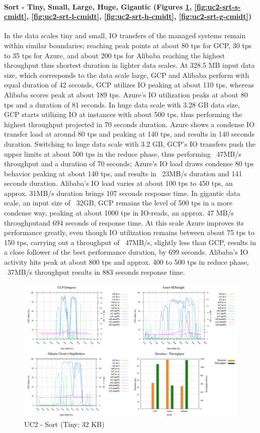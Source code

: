 \documentclass[review]{elsarticle}
\begin{document}
\paragraph{Sort - Tiny, Small, Large, Huge, Gigantic (Figures \ref{fig:uc2-srt-t-cmidt}, \ref{fig:uc2-srt-s-cmidt}, \ref{fig:uc2-srt-l-cmidt}, \ref{fig:uc2-srt-h-cmidt}, \ref{fig:uc2-srt-g-cmidt})} In the data scales tiny and small, IO transfers of the managed systems remain within similar boundaries; reaching peak points at about 80 tps for GCP, 30 tps to 35 tps for Azure, and about 200 tps for Alibaba reaching the highest throughput thus shortest duration in lighter data scales. At 328.5 MB input data size, which corresponds to the data scale large, GCP and Alibaba perform with equal duration of 42 seconds, GCP utilizes IO peaking at about 110 tps, whereas Alibaba scores peak at about 189 tps. Azure's IO utilization peaks at about 80 tps and a duration of 81 seconds. In huge data scale with 3.28 GB data size, GCP starts utilizing IO at instances with about 500 tps, thus performing the highest throughput projected in 70 seconds duration. Azure shows a condense IO transfer load at around 80 tps and peaking at 140 tps, and results in 140 seconds duration. Switching to huge data scale with 3.2 GB, GCP's IO transfers push the upper limits at about 500 tps in the reduce phase, thus performing ~47MB/s throughput and a duration of 70 seconds; Azure's IO load draws condense 80 tps behavior peaking at about 140 tps, and results in ~23MB/s duration and 141 seconds duration. Alibaba's IO load varies at about 100 tps to 450 tps, an approx. 31MB/s duration brings 107 seconds response time. In gigantic data scale, an input size of ~32GB, GCP remains the level of 500 tps in a more condense way, peaking at about 1000 tps in IO-reads, an approx. 47 MB/s throughputand 694 seconds of response time. At this scale Azure improves its performance greatly, even though IO utilization remains between about 75 tps to 150 tps, carrying out a throughput of ~47MB/s, slightly less than GCP, results in a close follower of the best performance duration, by 699 seconds. Alibaba's IO activity hits peak at about 800 tps and approx. 400 to 500 tps in reduce phase, ~37MB/s throughput results in 883 seconds response time.


\begin{figure}[p]
	\caption{UC2 - Sort (Tiny; 32 KB)}
	\label{fig:uc2-srt-t-cmidt}
	\includegraphics[width=\textwidth]{uc2-srt-t-cmidt}
	\centering
\end{figure}
\end{document}
